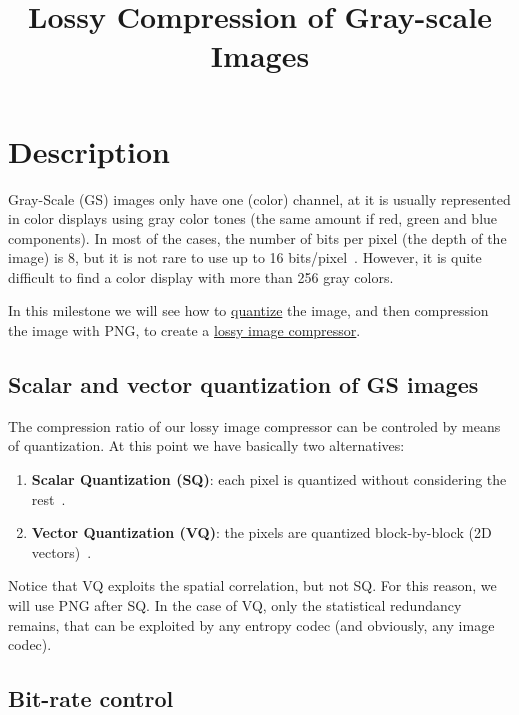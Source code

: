 

\title{Lossy Compression of Gray-scale Images}

\maketitle
\tableofcontents

\section{Description}

Gray-Scale (GS) images only have one (color) channel, at it is usually
represented in color displays using gray color tones (the same amount
if red, green and blue components). In most of the cases, the number
of bits per pixel (the depth of the image) is 8, but it is not rare to
use up to 16 bits/pixel~\cite{burger2016digital}. However, it is quite
difficult to find a color display with more than 256 gray colors.

In this milestone we will see how to
\href{https://vicente-gonzalez-ruiz.github.io/quantization/}{quantize}
the image, and then compression the image with PNG, to create a
\href{https://en.wikipedia.org/wiki/Lossy_compression}{lossy image
  compressor}.

\subsection{Scalar and vector quantization of GS images}

The compression ratio of our lossy image compressor can be controled
by means of quantization. At this point we have basically two
alternatives:
\begin{enumerate}
\item \textbf{Scalar Quantization (SQ)}: each pixel is quantized
  without considering the rest~\cite{vruiz__scalar_quantization}.
\item \textbf{Vector Quantization (VQ)}: the pixels are quantized
  block-by-block (2D vectors)~\cite{vruiz__vector_quantization}.
\end{enumerate}
Notice that VQ exploits the spatial correlation, but not SQ. For this
reason, we will use PNG after SQ. In the case of VQ, only the
statistical redundancy remains, that can be exploited by any entropy
codec (and obviously, any image codec).


\subsection{Bit-rate control}

